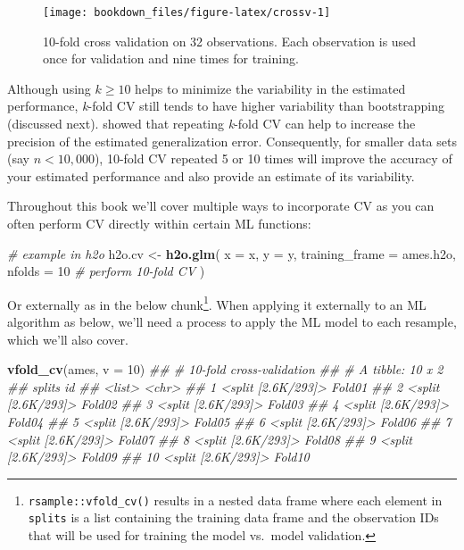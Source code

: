 \documentclass[]{krantz}
\makeatletter
\newenvironment{Shaded}{\begin{snugshade}}{\end{snugshade}}
\newcommand{\CommentTok}[1]{\textcolor[rgb]{0.37,0.37,0.37}{\textit{#1}}}
\newcommand{\DataTypeTok}[1]{\textcolor[rgb]{0.27,0.27,0.27}{#1}}
\newcommand{\DecValTok}[1]{\textcolor[rgb]{0.06,0.06,0.06}{#1}}
\newcommand{\KeywordTok}[1]{\textcolor[rgb]{0.27,0.27,0.27}{\textbf{#1}}}
\newcommand{\NormalTok}[1]{#1}
\newcommand{\StringTok}[1]{\textcolor[rgb]{0.5,0.5,0.5}{#1}}
\newenvironment{kframe}{%
\medskip{}
\setlength{\fboxsep}{.8em}
 \def\at@end@of@kframe{}%
 \ifinner\ifhmode%
  \def\at@end@of@kframe{\end{minipage}}%
  \begin{minipage}{\columnwidth}%
 \fi\fi%
 \def\FrameCommand##1{\hskip\@totalleftmargin \hskip-\fboxsep
 \colorbox{shadecolor}{##1}\hskip-\fboxsep
     \hskip-\linewidth \hskip-\@totalleftmargin \hskip\columnwidth}%
 \MakeFramed {\advance\hsize-\width
   \@totalleftmargin\z@ \linewidth\hsize
   \@setminipage}}%
 {\par\unskip\endMakeFramed%
 \at@end@of@kframe}
\renewenvironment{Shaded}{\begin{kframe}}{\end{kframe}}
\makeatother
\begin{document}
\begin{figure}

{\centering \texttt{[image: bookdown\_files/figure-latex/crossv-1]} 

}

\caption{10-fold cross validation on 32 observations. Each observation is used once for validation and nine times for training.}\label{fig:crossv}
\end{figure}

Although using \(k \geq 10\) helps to minimize the variability in the estimated performance, \emph{k}-fold CV still tends to have higher variability than bootstrapping (discussed next). \citet{kim2009estimating} showed that repeating \emph{k}-fold CV can help to increase the precision of the estimated generalization error. Consequently, for smaller data sets (say \(n < 10,000\)), 10-fold CV repeated 5 or 10 times will improve the accuracy of your estimated performance and also provide an estimate of its variability.

Throughout this book we'll cover multiple ways to incorporate CV as you can often perform CV directly within certain ML functions:

\begin{Shaded}
\begin{Highlighting}[]
\CommentTok{# example in h2o}
\NormalTok{h2o.cv <-}\StringTok{ }\KeywordTok{h2o.glm}\NormalTok{(}
  \DataTypeTok{x =}\NormalTok{ x, }
  \DataTypeTok{y =}\NormalTok{ y, }
  \DataTypeTok{training_frame =}\NormalTok{ ames.h2o,}
  \DataTypeTok{nfolds =} \DecValTok{10}  \CommentTok{# perform 10-fold CV}
\NormalTok{)}
\end{Highlighting}
\end{Shaded}

Or externally as in the below chunk\footnote{\texttt{rsample::vfold\_cv()} results in a nested data frame where each element in \texttt{splits} is a list containing the training data frame and the observation IDs that will be used for training the model vs.~model validation.}. When applying it externally to an ML algorithm as below, we'll need a process to apply the ML model to each resample, which we'll also cover.

\begin{Shaded}
\begin{Highlighting}[]
\KeywordTok{vfold_cv}\NormalTok{(ames, }\DataTypeTok{v =} \DecValTok{10}\NormalTok{)}
\CommentTok{## #  10-fold cross-validation }
\CommentTok{## # A tibble: 10 x 2}
\CommentTok{##    splits             id    }
\CommentTok{##    <list>             <chr> }
\CommentTok{##  1 <split [2.6K/293]> Fold01}
\CommentTok{##  2 <split [2.6K/293]> Fold02}
\CommentTok{##  3 <split [2.6K/293]> Fold03}
\CommentTok{##  4 <split [2.6K/293]> Fold04}
\CommentTok{##  5 <split [2.6K/293]> Fold05}
\CommentTok{##  6 <split [2.6K/293]> Fold06}
\CommentTok{##  7 <split [2.6K/293]> Fold07}
\CommentTok{##  8 <split [2.6K/293]> Fold08}
\CommentTok{##  9 <split [2.6K/293]> Fold09}
\CommentTok{## 10 <split [2.6K/293]> Fold10}
\end{Highlighting}
\end{Shaded}
\end{document}

